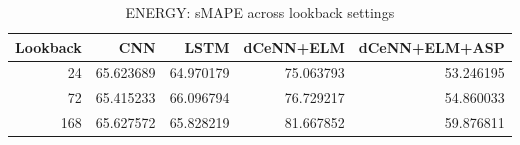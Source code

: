 \begin{table}
\caption{ENERGY: sMAPE across lookback settings}
\begin{tabular}{rrrrr}
\toprule
Lookback & CNN & LSTM & dCeNN+ELM & dCeNN+ELM+ASP \\
\midrule
24 & 65.623689 & 64.970179 & 75.063793 & 53.246195 \\
72 & 65.415233 & 66.096794 & 76.729217 & 54.860033 \\
168 & 65.627572 & 65.828219 & 81.667852 & 59.876811 \\
\bottomrule
\end{tabular}
\end{table}
